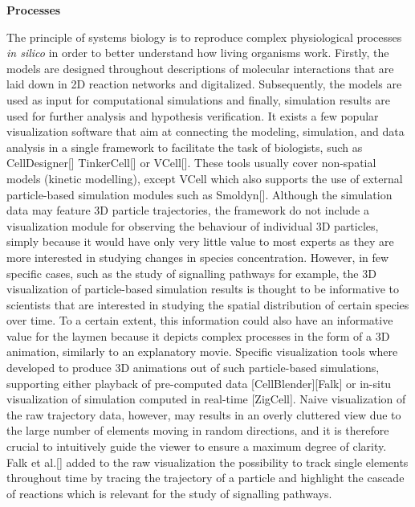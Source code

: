 
\textbf{Processes}


The principle of systems biology is to reproduce complex physiological processes \textit{in silico} in order to better understand how living organisms work.
Firstly, the models are designed throughout descriptions of molecular interactions that are laid down in 2D reaction networks and digitalized.
Subsequently, the models are used as input for computational simulations and finally, simulation results are used for further analysis and hypothesis verification.
It exists a few popular visualization software that aim at connecting the modeling, simulation, and data analysis in a single framework to facilitate the task of biologists, such as CellDesigner[] TinkerCell[] or VCell[].
These tools usually cover non-spatial models (kinetic modelling), except VCell which also supports the use of external particle-based simulation modules such as Smoldyn[].
Although the simulation data may feature 3D particle trajectories, the framework do not include a visualization module for observing the behaviour of individual 3D particles, simply because it would have only very little value to most experts as they are more interested in studying changes in species concentration.
However, in few specific cases, such as the study of signalling pathways for example, the 3D visualization of particle-based simulation results is thought to be informative to scientists that are interested in studying the spatial distribution of certain species over time.
To a certain extent, this information could also have an informative value for the laymen because it depicts complex processes in the form of a 3D animation, similarly to an explanatory movie.
Specific visualization tools where developed to produce 3D animations out of such particle-based simulations, supporting either playback of pre-computed data [CellBlender][Falk] or in-situ visualization of simulation computed in real-time [ZigCell].
Naive visualization of the raw trajectory data, however, may results in an overly cluttered view due to the large number of elements moving in random directions, and it is therefore crucial to intuitively guide the viewer to ensure a maximum degree of clarity.
Falk et al.[] added to the raw visualization the possibility to track single elements throughout time by tracing the trajectory of a particle and highlight the cascade of reactions which is relevant for the study of signalling pathways.
